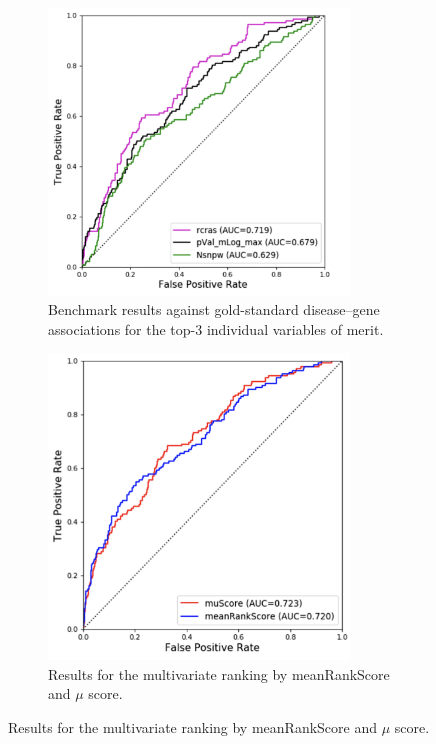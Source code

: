 \begin{figure}
\begin{subfigure}[c]{0.5\textwidth}
\includegraphics[width=8cm]{figures/tiga/FIG04_ROC_a.png}
\caption{Benchmark results against gold-standard disease–gene associations for the top-3 individual variables of merit.}
\label{fig:TIGA_rocs_a}
\end{subfigure}
\begin{subfigure}[c]{0.5\textwidth}
\includegraphics[width=8cm]{figures/tiga/FIG04_ROC_b.png}
\caption{Results for the multivariate ranking by meanRankScore and $\mu$ score.}
\label{fig:TIGA_rocs_b}
\end{subfigure}


\end{figure}
